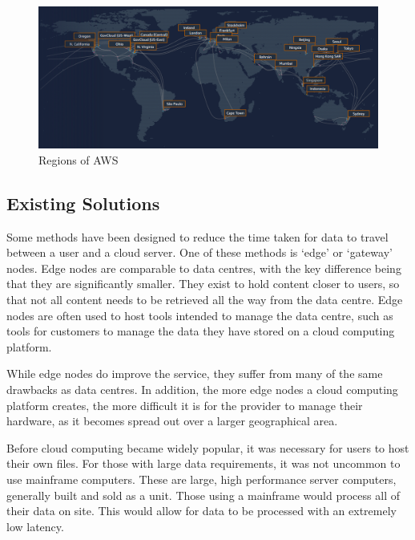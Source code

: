 \begin{figure}[ht]
  \centering
  \includegraphics[width=\textwidth]{assets/aws_infrastructure.png}
  \caption{Regions of AWS}
  \label{aws_regions}
\end{figure}

\subsection{Existing Solutions}
\label{existing_solutions}


Some methods have been designed to reduce the time taken for data to travel between a user and a cloud server.
One of these methods is `edge' or `gateway' nodes.
Edge nodes are comparable to data centres, with the key difference being that they are significantly smaller. They exist to hold content closer to users, so that not all content needs to be retrieved all the way from the data centre. Edge nodes are often used to host tools intended to manage the data centre, such as tools for customers to manage the data they have stored on a cloud computing platform.

While edge nodes do improve the service, they suffer from many of the same drawbacks as data centres. In addition, the more edge nodes a cloud computing platform creates, the more difficult it is for the provider to manage their hardware, as it becomes spread out over a larger geographical area.

Before cloud computing became widely popular, it was necessary for users to host their own files. For those with large data requirements, it was not uncommon to use mainframe computers. These are large, high performance server computers, generally built and sold as a unit. Those using a mainframe would process all of their data on site. This would allow for data to be processed with an extremely low latency.

